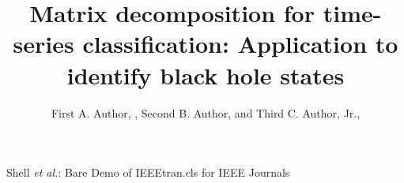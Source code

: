 \documentclass[journal]{IEEEtran}
\begin{document}
	
	
	\title{ Matrix decomposition for time-series classification: Application to identify black hole states}
	
	\author{First A. Author, , Second B. Author, and Third C. Author, Jr., 
	}
	
	{Shell \MakeLowercase{\textit{et al.}}: Bare Demo of IEEEtran.cls for IEEE Journals}
	\maketitle
	
\end{document}
